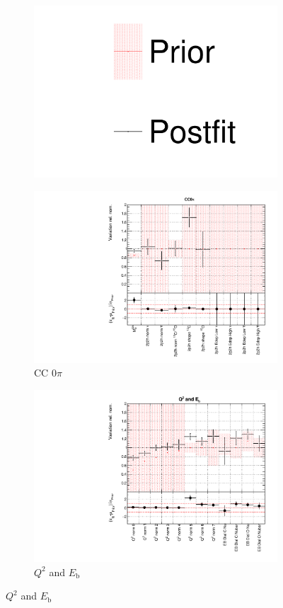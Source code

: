 \begin{figure}[!htbp]
\centering
\begin{subfigure}{0.95\textwidth}
  \centering
  \includegraphics[width=0.25\linewidth]{figs/dat_leg}
\end{subfigure}
\begin{subfigure}{0.49\textwidth}
  \centering
  \includegraphics[width=0.9\linewidth]{figs/datxsec1}
  \caption{CC 0$\pi$}
\end{subfigure}
\begin{subfigure}{0.49\textwidth}
  \centering
  \includegraphics[width=0.9\linewidth]{figs/datxsec2}
  \caption{$Q^2$ and $E_{\mathrm{b}}$}
\end{subfigure}

\end{figure}
